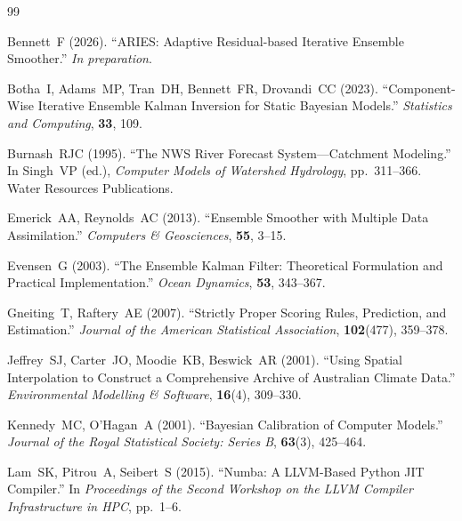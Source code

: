 \documentclass[article,nojss]{jss}
\begin{document}
\begin{thebibliography}{99}

  Bennett~F (2026).
  \newblock ``ARIES: Adaptive Residual-based Iterative Ensemble Smoother.''
  \newblock \emph{In preparation}.

  Botha~I, Adams~MP, Tran~DH, Bennett~FR, Drovandi~CC (2023).
  \newblock ``Component-Wise Iterative Ensemble Kalman Inversion for
             Static Bayesian Models.''
  \newblock \emph{Statistics and Computing}, \textbf{33}, 109.

  Burnash~RJC (1995).
  \newblock ``The NWS River Forecast System---Catchment Modeling.''
  \newblock In Singh~VP (ed.), \emph{Computer Models of Watershed
             Hydrology}, pp.~311--366. Water Resources Publications.

  Emerick~AA, Reynolds~AC (2013).
  \newblock ``Ensemble Smoother with Multiple Data Assimilation.''
  \newblock \emph{Computers \& Geosciences}, \textbf{55}, 3--15.

  Evensen~G (2003).
  \newblock ``The Ensemble Kalman Filter: Theoretical Formulation and
             Practical Implementation.''
  \newblock \emph{Ocean Dynamics}, \textbf{53}, 343--367.

  Gneiting~T, Raftery~AE (2007).
  \newblock ``Strictly Proper Scoring Rules, Prediction, and Estimation.''
  \newblock \emph{Journal of the American Statistical Association},
             \textbf{102}(477), 359--378.

  Jeffrey~SJ, Carter~JO, Moodie~KB, Beswick~AR (2001).
  \newblock ``Using Spatial Interpolation to Construct a Comprehensive
             Archive of Australian Climate Data.''
  \newblock \emph{Environmental Modelling \& Software}, \textbf{16}(4),
             309--330.

  Kennedy~MC, O'Hagan~A (2001).
  \newblock ``Bayesian Calibration of Computer Models.''
  \newblock \emph{Journal of the Royal Statistical Society: Series B},
             \textbf{63}(3), 425--464.

  Lam~SK, Pitrou~A, Seibert~S (2015).
  \newblock ``Numba: A LLVM-Based Python JIT Compiler.''
  \newblock In \emph{Proceedings of the Second Workshop on the LLVM
             Compiler Infrastructure in HPC}, pp.~1--6.


\end{thebibliography}
\end{document}
